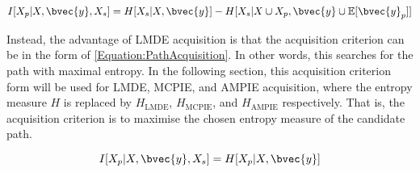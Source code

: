 			\begin{equation}
				I[X_{p} | X, \bvec{y}, X_{s}] = H[X_{s} | X, \bvec{y}] - H[X_{s} | X \cup X_{p}, \bvec{y} \cup \mathbb{E}[\bvec{y}_{p}]]
			\label{Equation:DifferentialAcquisition}
			\end{equation}
			
			Instead, the advantage of LMDE acquisition is that the acquisition criterion can be in the form of \eqref{Equation:PathAcquisition}. In other words, this searches for the path with maximal entropy. In the following section, this acquisition criterion form will be used for LMDE, MCPIE, and AMPIE acquisition, where the entropy measure $H$ is replaced by $H_{\mathrm{LMDE}}$, $H_{\mathrm{MCPIE}}$, and $H_{\mathrm{AMPIE}}$ respectively. That is, the acquisition criterion is to maximise the chosen entropy measure of the candidate path.

			\begin{equation}
				I[X_{p} | X, \bvec{y}, X_{s}] = H[X_{p} | X, \bvec{y}]
			\label{Equation:PathAcquisition}
			\end{equation}
			